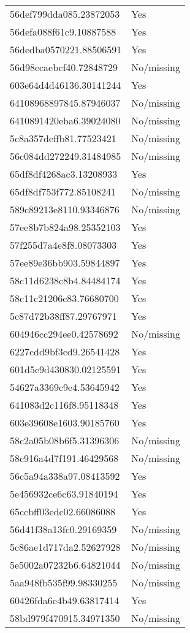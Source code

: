 \begin{tabular}{ll}
56def799dda085.23872053 & Yes \\
56defa088f61c9.10887588 & Yes \\
56dedba0570221.88506591 & Yes \\
56d98ecaebcf40.72848729 & No/missing \\
603e64d4d46136.30141244 & Yes \\
64108968897845.87946037 & No/missing \\
6410891420eba6.39024080 & No/missing \\
5c8a357deffb81.77523421 & No/missing \\
56c084dd272249.31484985 & No/missing \\
65df8df4268ac3.13208933 & Yes \\
65df8df753f772.85108241 & No/missing \\
589c89213e8110.93346876 & No/missing \\
57ee8b7b824a98.25352103 & Yes \\
57f255d7a4e8f8.08073303 & Yes \\
57ee89e36bb903.59844897 & Yes \\
58c11d6238c8b4.84484174 & Yes \\
58c11c21206c83.76680700 & Yes \\
5c87d72b38ff87.29767971 & Yes \\
604946cc294ee0.42578692 & No/missing \\
6227cdd9bf3cd9.26541428 & Yes \\
601d5e9d430830.02125591 & Yes \\
54627a3369c9e4.53645942 & Yes \\
641083d2c116f8.95118348 & Yes \\
603e39608e1603.90185760 & Yes \\
58c2a05b08b6f5.31396306 & No/missing \\
58c916a4d7f191.46429568 & No/missing \\
56c5a94a338a97.08413592 & Yes \\
5e456932ce6c63.91840194 & Yes \\
65ccbff03edc02.66086088 & Yes \\
56d41f38a13fc0.29169359 & No/missing \\
5c86ae1d717da2.52627928 & No/missing \\
5e5002a07232b6.64821044 & No/missing \\
5aa948fb535f99.98330255 & No/missing \\
60426fda6e4b49.63817414 & Yes \\
58bd979f470915.34971350 & No/missing \\

\end{tabular}
